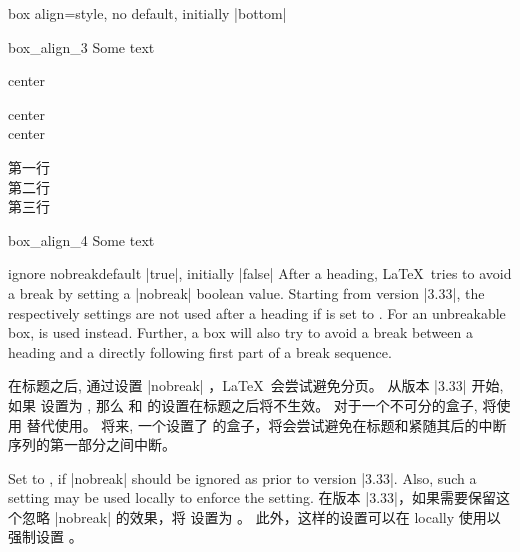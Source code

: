 \begin{docTcbKey}[][doc new=2014-10-10]{box align}{=}{style, no default, initially |bottom|}
\begin{exdispExample}{box_align_3}
Some text\dotfill
\begin{tcolorbox}[box align=center]
center
\end{tcolorbox}
\begin{tcolorbox}[box align=center]
center\\center
\end{tcolorbox}
\begin{tcolorbox}
第一行\\第二行\\第三行
\end{tcolorbox}
\end{exdispExample}

\begin{exdispExample}{box_align_4}
Some text\dotfill
{}
\end{exdispExample}
\end{docTcbKey}





\begin{docTcbKey}[][doc new=2014-12-11]{ignore nobreak}{}{default |true|, initially |false|}
After a heading, \LaTeX\ tries to avoid a break by setting a |nobreak| boolean value.
Starting from version |3.33|, the  respectively 
settings are not used after a heading if  is
set to . For an unbreakable box,  is used instead.
Further, a  box will also try to
avoid a break between a heading and a directly following first part of a
break sequence.

在标题之后, 通过设置 |nobreak| ，\LaTeX\ 会尝试避免分页。
从版本 |3.33| 开始, 如果  设置为 , 那么  和 
的设置在标题之后将不生效。%
对于一个不可分的盒子, 将使用  替代使用。
将来, 一个设置了  的盒子，将会尝试避免在标题和紧随其后的中断序列的第一部分之间中断。

Set  to , if |nobreak| should be
ignored as prior to version |3.33|. Also, such a setting may be used locally to
enforce the  setting.
在版本 |3.33|，如果需要保留这个忽略 |nobreak| 的效果，将  设置为 。 此外，这样的设置可以在 locally 使用以强制设置  。
\end{docTcbKey}

